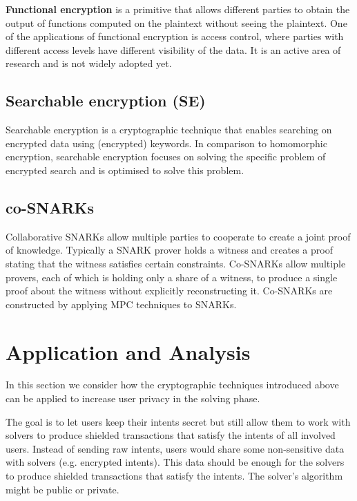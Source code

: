 \documentclass[
    9pt,            %
    report,        %
    affiltop,       %
]{art}
\begin{document}
\textbf{Functional encryption} \cite{fe} is a primitive that allows different parties to obtain the output of functions computed on the plaintext without seeing the plaintext. One of the applications of functional encryption is access control, where parties with different access levels have different visibility of the data. It is an active area of research and is not widely adopted yet.


\subsection{Searchable encryption (SE)}

Searchable encryption \cite{se} is a cryptographic technique that enables searching on encrypted data using (encrypted) keywords. In comparison to homomorphic encryption, searchable encryption focuses on solving the specific problem of encrypted search and is optimised to solve this problem.


\subsection{co-SNARKs}

Collaborative SNARKs \cite{cosnarks} allow multiple parties to cooperate to create a joint proof of knowledge. Typically a SNARK prover holds a witness and creates a proof stating that the witness satisfies certain constraints. Co-SNARKs allow multiple provers, each of which is holding only a share of a witness, to produce a single proof about the witness without explicitly reconstructing it. Co-SNARKs are constructed by applying MPC techniques to SNARKs.

\section{Application and Analysis}

In this section we consider how the cryptographic techniques introduced above can be applied to increase user privacy in the solving phase.

The goal is to let users keep their intents secret but still allow them to work with solvers to produce shielded transactions that satisfy the intents of all involved users. Instead of sending raw intents, users would share some non-sensitive data with solvers (e.g. encrypted intents). This data should be enough for the solvers to produce shielded transactions that satisfy the intents. The solver's algorithm might be public or private. 
\end{document}
